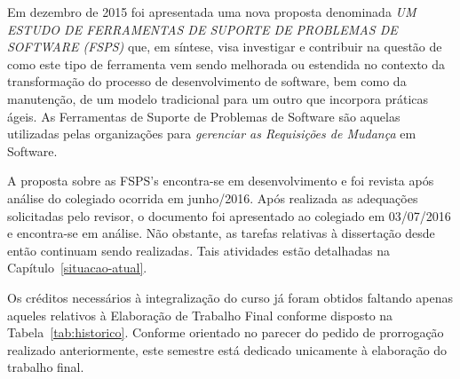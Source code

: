 \documentclass[10pt,a4paper]{report}
\begin{document}
Em dezembro de 2015 foi apresentada uma nova proposta denominada  \textit{UM
	ESTUDO DE FERRAMENTAS DE SUPORTE DE PROBLEMAS DE SOFTWARE (FSPS)} que, em
síntese, visa investigar e contribuir na questão de como este tipo de ferramenta
vem sendo melhorada ou estendida no contexto da transformação do processo de
desenvolvimento de software, bem como da manutenção, de um modelo tradicional
para um outro que incorpora práticas ágeis. As Ferramentas de Suporte de
Problemas de Software são aquelas utilizadas pelas organizações para
\textit{gerenciar as Requisições de Mudança}\cite{1703974} em Software.

A proposta sobre as FSPS's encontra-se em desenvolvimento e foi revista após
análise do colegiado ocorrida em junho/2016. Após realizada as adequações
solicitadas pelo revisor, o documento foi apresentado ao colegiado em 03/07/2016
e encontra-se em análise. Não obstante, as tarefas relativas à dissertação desde
então continuam sendo realizadas. Tais atividades estão detalhadas na
Capítulo~\ref{situacao-atual}.

Os créditos necessários à integralização do curso já foram obtidos faltando
apenas aqueles relativos à Elaboração de Trabalho Final conforme disposto na
Tabela~\ref{tab:historico}. Conforme orientado no parecer do pedido de
prorrogação realizado anteriormente, este semestre está dedicado unicamente à
elaboração do trabalho final.
\end{document}
